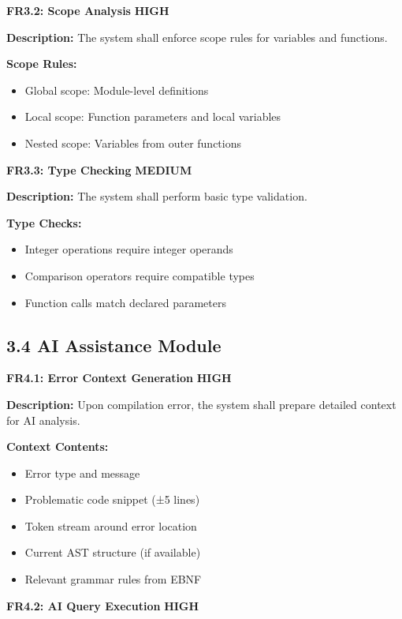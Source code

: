 \documentclass[a4paper,11pt]{article}
\newcommand{\priority}[1]{\colorbox{red!20}{\textbf{#1}}}
\begin{document}
\vspace{3mm}
\textbf{FR3.2: Scope Analysis} \priority{HIGH}

\textbf{Description:} The system shall enforce scope rules for variables and functions.

\textbf{Scope Rules:}
\begin{itemize}
    \item Global scope: Module-level definitions
    \item Local scope: Function parameters and local variables
    \item Nested scope: Variables from outer functions
\end{itemize}

\vspace{3mm}
\textbf{FR3.3: Type Checking} \priority{MEDIUM}

\textbf{Description:} The system shall perform basic type validation.

\textbf{Type Checks:}
\begin{itemize}
    \item Integer operations require integer operands
    \item Comparison operators require compatible types
    \item Function calls match declared parameters
\end{itemize}

\subsection{3.4 AI Assistance Module}

\textbf{FR4.1: Error Context Generation} \priority{HIGH}

\textbf{Description:} Upon compilation error, the system shall prepare detailed context for AI analysis.

\textbf{Context Contents:}
\begin{itemize}
    \item Error type and message
    \item Problematic code snippet (±5 lines)
    \item Token stream around error location
    \item Current AST structure (if available)
    \item Relevant grammar rules from EBNF
\end{itemize}

\vspace{3mm}
\textbf{FR4.2: AI Query Execution} \priority{HIGH}
\end{document}
